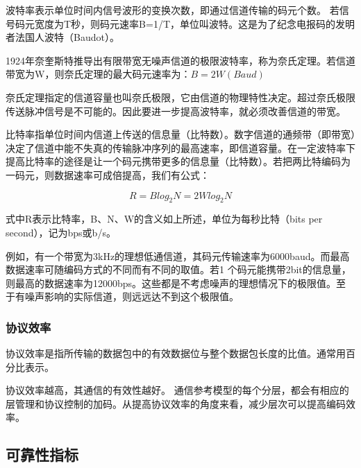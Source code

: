 \begin{remark}

波特率表示单位时间内信号波形的变换次数，即通过信道传输的码元个数。
若信号码元宽度为T秒，则码元速率B=1/T，单位叫波特。这是为了纪念电报码的发明者法国人波特（Baudot）。

1924年奈奎斯特推导出有限带宽无噪声信道的极限波特率，称为奈氏定理。若信道带宽为W，则奈氏定理的最大码元速率为：$B=2W (Baud)$

奈氏定理指定的信道容量也叫奈氏极限，它由信道的物理特性决定。超过奈氏极限传送脉冲信号是不可能的。因此要进一步提高波特率，就必须改善信道的带宽。

比特率指单位时间内信道上传送的信息量（比特数）。数字信道的通频带（即带宽）决定了信道中能不失真的传输脉冲序列的最高速率，即信道容量。在一定波特率下提高比特率的途径是让一个码元携带更多的信息量（比特数）。若把两比特编码为一码元，则数据速率可成倍提高，我们有公式：

\begin{equation}
R=Blog_2N=2Wlog_2N
\end{equation}

式中R表示比特率，B、N、W的含义如上所述，单位为每秒比特（bits per second），记为bps或b/s。

\end{remark}





  \begin{remark}

例如，有一个带宽为3kHz的理想低通信道，其码元传输速率为6000baud。而最高数据速率可随编码方式的不同而有不同的取值。若1 个码元能携带2bit的信息量，则最高的数据速率为12000bps。这些都是不考虑噪声的理想情况下的极限值。至于有噪声影响的实际信道，则远远达不到这个极限值。

  \end{remark}


  \subsubsection{协议效率}

协议效率是指所传输的数据包中的有效数据位与整个数据包长度的比值。通常用百分比表示。

  协议效率越高，其通信的有效性越好。
   通信参考模型的每个分层，都会有相应的层管理和协议控制的加码。从提高协议效率的角度来看，减少层次可以提高编码效率。


\subsection{可靠性指标}

